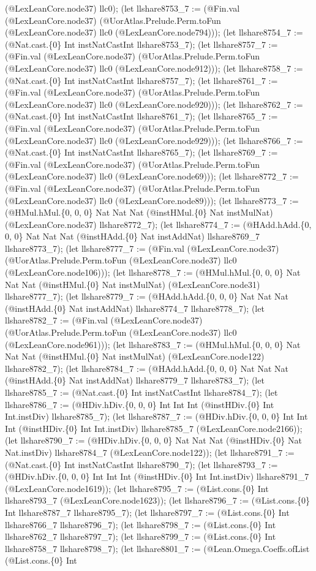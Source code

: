 \documentclass[11pt]{article}
\begin{document}
(@LexLeanCore.node37) llc0); (let llshare8753\_7 := (@Fin.val (@LexLeanCore.node37) (@UorAtlas.Prelude.Perm.toFun (@LexLeanCore.node37) llc0 (@LexLeanCore.node794))); (let llshare8754\_7 := (@Nat.cast.\{0\} Int instNatCastInt llshare8753\_7); (let llshare8757\_7 := (@Fin.val (@LexLeanCore.node37) (@UorAtlas.Prelude.Perm.toFun (@LexLeanCore.node37) llc0 (@LexLeanCore.node912))); (let llshare8758\_7 := (@Nat.cast.\{0\} Int instNatCastInt llshare8757\_7); (let llshare8761\_7 := (@Fin.val (@LexLeanCore.node37) (@UorAtlas.Prelude.Perm.toFun (@LexLeanCore.node37) llc0 (@LexLeanCore.node920))); (let llshare8762\_7 := (@Nat.cast.\{0\} Int instNatCastInt llshare8761\_7); (let llshare8765\_7 := (@Fin.val (@LexLeanCore.node37) (@UorAtlas.Prelude.Perm.toFun (@LexLeanCore.node37) llc0 (@LexLeanCore.node929))); (let llshare8766\_7 := (@Nat.cast.\{0\} Int instNatCastInt llshare8765\_7); (let llshare8769\_7 := (@Fin.val (@LexLeanCore.node37) (@UorAtlas.Prelude.Perm.toFun (@LexLeanCore.node37) llc0 (@LexLeanCore.node69))); (let llshare8772\_7 := (@Fin.val (@LexLeanCore.node37) (@UorAtlas.Prelude.Perm.toFun (@LexLeanCore.node37) llc0 (@LexLeanCore.node89))); (let llshare8773\_7 := (@HMul.hMul.\{0, 0, 0\} Nat Nat Nat (@instHMul.\{0\} Nat instMulNat) (@LexLeanCore.node37) llshare8772\_7); (let llshare8774\_7 := (@HAdd.hAdd.\{0, 0, 0\} Nat Nat Nat (@instHAdd.\{0\} Nat instAddNat) llshare8769\_7 llshare8773\_7); (let llshare8777\_7 := (@Fin.val (@LexLeanCore.node37) (@UorAtlas.Prelude.Perm.toFun (@LexLeanCore.node37) llc0 (@LexLeanCore.node106))); (let llshare8778\_7 := (@HMul.hMul.\{0, 0, 0\} Nat Nat Nat (@instHMul.\{0\} Nat instMulNat) (@LexLeanCore.node31) llshare8777\_7); (let llshare8779\_7 := (@HAdd.hAdd.\{0, 0, 0\} Nat Nat Nat (@instHAdd.\{0\} Nat instAddNat) llshare8774\_7 llshare8778\_7); (let llshare8782\_7 := (@Fin.val (@LexLeanCore.node37) (@UorAtlas.Prelude.Perm.toFun (@LexLeanCore.node37) llc0 (@LexLeanCore.node961))); (let llshare8783\_7 := (@HMul.hMul.\{0, 0, 0\} Nat Nat Nat (@instHMul.\{0\} Nat instMulNat) (@LexLeanCore.node122) llshare8782\_7); (let llshare8784\_7 := (@HAdd.hAdd.\{0, 0, 0\} Nat Nat Nat (@instHAdd.\{0\} Nat instAddNat) llshare8779\_7 llshare8783\_7); (let llshare8785\_7 := (@Nat.cast.\{0\} Int instNatCastInt llshare8784\_7); (let llshare8786\_7 := (@HDiv.hDiv.\{0, 0, 0\} Int Int Int (@instHDiv.\{0\} Int Int.instDiv) llshare8785\_7); (let llshare8787\_7 := (@HDiv.hDiv.\{0, 0, 0\} Int Int Int (@instHDiv.\{0\} Int Int.instDiv) llshare8785\_7 (@LexLeanCore.node2166)); (let llshare8790\_7 := (@HDiv.hDiv.\{0, 0, 0\} Nat Nat Nat (@instHDiv.\{0\} Nat Nat.instDiv) llshare8784\_7 (@LexLeanCore.node122)); (let llshare8791\_7 := (@Nat.cast.\{0\} Int instNatCastInt llshare8790\_7); (let llshare8793\_7 := (@HDiv.hDiv.\{0, 0, 0\} Int Int Int (@instHDiv.\{0\} Int Int.instDiv) llshare8791\_7 (@LexLeanCore.node1619)); (let llshare8795\_7 := (@List.cons.\{0\} Int llshare8793\_7 (@LexLeanCore.node1623)); (let llshare8796\_7 := (@List.cons.\{0\} Int llshare8787\_7 llshare8795\_7); (let llshare8797\_7 := (@List.cons.\{0\} Int llshare8766\_7 llshare8796\_7); (let llshare8798\_7 := (@List.cons.\{0\} Int llshare8762\_7 llshare8797\_7); (let llshare8799\_7 := (@List.cons.\{0\} Int llshare8758\_7 llshare8798\_7); (let llshare8801\_7 := (@Lean.Omega.Coeffs.ofList (@List.cons.\{0\} Int 
\end{document}
